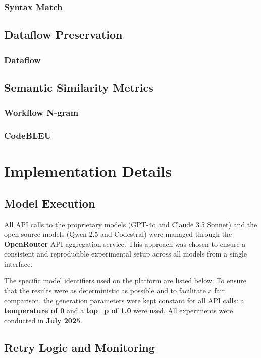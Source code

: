 \subsubsection{Syntax Match}
\subsection{Dataflow Preservation}

\subsubsection{Dataflow}

\subsection{Semantic Similarity Metrics}
\subsubsection{Workflow N-gram}

\subsubsection{CodeBLEU}


\section{Implementation Details}
\subsection{Model Execution}
\label{sec:implementation-details}

All API calls to the proprietary models (GPT-4o and Claude 3.5 Sonnet) and the open-source models (Qwen 2.5 and Codestral) were managed through the \textbf{OpenRouter} API aggregation service. This approach was chosen to ensure a consistent and reproducible experimental setup across all models from a single interface.

The specific model identifiers used on the platform are listed below. To ensure that the results were as deterministic as possible and to facilitate a fair comparison, the generation parameters were kept constant for all API calls: a \textbf{temperature of 0} and a \textbf{top\_p of 1.0} were used. All experiments were conducted in \textbf{July 2025}.
\subsection{Retry Logic and Monitoring}

